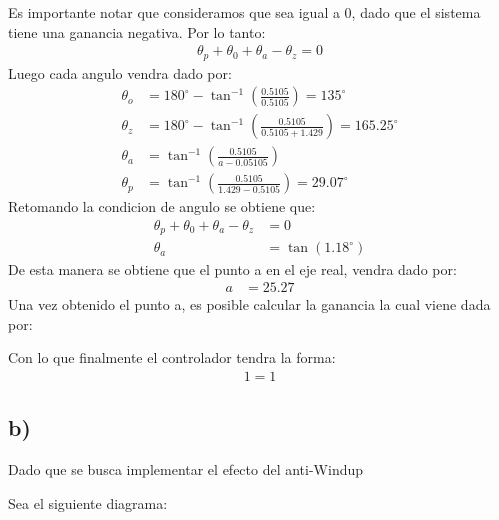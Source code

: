 \documentclass[
  11pt,
  letterpaper,
   addpoints,
   answers
  ]{exam}
\begin{document}
\begin{questions}
\begin{solution}
Es importante notar que consideramos que sea igual a 0, dado que el sistema tiene una ganancia negativa. Por lo tanto:
\begin{align}
    \theta_p + \theta_0 + \theta_a - \theta_z = 0
\end{align}
Luego cada angulo vendra dado por:
\begin{align}
    \theta_o &= 180^{\circ} - \tan^{-1}\left(\frac{0.5105}{0.5105}\right) = 135^{\circ} \\
    \theta_z &= 180^{\circ} - \tan^{-1}\left(\frac{0.5105}{0.5105 + 1.429}\right) = 165.25^{\circ} \\
    \theta_a &= \tan^{-1}\left( \frac{0.5105}{a - 0.05105}\right) \\
    \theta_p &= \tan^{-1}\left( \frac{0.5105}{1.429 - 0.5105}\right) = 29.07^{\circ}
\end{align}
Retomando la condicion de angulo se obtiene que:
\begin{align}
    \theta_p + \theta_0 + \theta_a - \theta_z &= 0\\
    \theta_{a}&=\tan(1.18^{\circ})
\end{align}
De esta manera se obtiene que el punto a en el eje real, vendra dado por:
\begin{align}
    a &=25.27
\end{align}
Una vez obtenido el punto a, es posible calcular la ganancia la cual viene dada por:


Con lo que finalmente el controlador tendra la forma:
\begin{align}
    1=1
\end{align}
\subsection*{b)}
Dado que se busca implementar el efecto del anti-Windup 
\end{solution}
    
    \question Sea el siguiente diagrama:
    \begin{center}

\end{center}
\end{questions}
\end{document}
